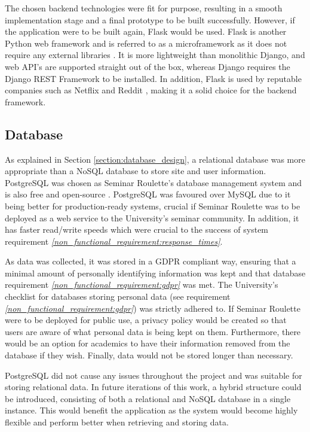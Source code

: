 \documentclass{l4proj}
\begin{document}
The chosen backend technologies were fit for purpose, resulting in a smooth implementation stage and a final prototype to be built successfully. However, if the application were to be built again, Flask would be used. Flask is another Python web framework and is referred to as a microframework as it does not require any external libraries \citep{flask}. It is more lightweight than monolithic Django, and web API's are supported straight out of the box, whereas Django requires the Django REST Framework to be installed. In addition, Flask is used by reputable companies such as Netflix and Reddit \citep{flaskcompanies}, making it a solid choice for the backend framework.

\subsection{Database}

As explained in Section \ref{section:database_design}, a relational database was more appropriate than a NoSQL database to store site and user information. PostgreSQL was chosen as Seminar Roulette's database management system and is also free and open-source \citep{postgresql}. PostgreSQL was favoured over MySQL due to it being better for production-ready systems, crucial if Seminar Roulette was to be deployed as a web service to the University's seminar community. In addition, it has faster read/write speeds which were crucial to the success of system requirement \emph{\ref{non_functional_requirement:response_times}}.

As data was collected, it was stored in a GDPR compliant way, ensuring that a minimal amount of personally identifying information was kept and that database requirement \emph{\ref{non_functional_requirement:gdpr}} was met. The University's checklist for databases storing personal data (see requirement \emph{\ref{non_functional_requirement:gdpr}}) was strictly adhered to. If Seminar Roulette were to be deployed for public use, a privacy policy would be created so that users are aware of what personal data is being kept on them. Furthermore, there would be an option for academics to have their information removed from the database if they wish. Finally, data would not be stored longer than necessary.

PostgreSQL did not cause any issues throughout the project and was suitable for storing relational data. In future iterations of this work, a hybrid structure could be introduced, consisting of both a relational and NoSQL database in a single instance. This would benefit the application as the system would become highly flexible and perform better when retrieving and storing data.
\end{document}
